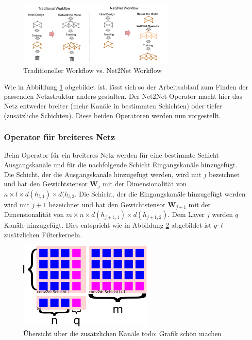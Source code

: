 \begin{figure}[h]
 \centering
 \includegraphics[width=0.7\textwidth]{KapitelPartA/images/net2net.png}
 \caption{Traditioneller Workflow vs. Net2Net Workflow}
 \label{abb:net2net}
\end{figure}


Wie in Abbildung \ref{abb:net2net} abgebildet ist, lässt sich so der Arbeitsablauf zum Finden der passenden Netzstruktur anders gestalten. Der Net2Net-Operator macht hier das Netz entweder breiter (mehr Kanäle in bestimmten Schichten) oder tiefer (zusätzliche Schichten). Diese beiden Operatoren werden nun vorgestellt.

\subsubsection{Operator für breiteres Netz}
Beim Operator für ein breiteres Netz werden für eine bestimmte Schicht Ausgangskanäle und für die nachfolgende Schicht Eingangskanäle hinzugefügt. Die Schicht, der die Ausgangskanäle hinzugefügt werden, wird mit $j$ bezeichnet und hat den Gewichtstensor $\mathbf{W}_j$ mit der Dimensionalität von $n \times l \times d(h_{l,1}) \times d(h_{l,2}$. Die Schicht, der die Eingangskanäle hinzugefügt werden wird mit $j+1$ bezeichnet und hat den Gewichtstensor $\mathbf{W}_{j+1}$ mit der Dimensionalität von $m \times n \times d(h_{j+1,1}) \times d(h_{j+1,2})$. Dem Layer $j$ werden $q$ Kanäle hinzugefügt. Dies entspricht wie in Abbildung \ref{abb:channels} abgebildet ist $q \cdot l $ zusätzlichen Filterkerneln. 
\begin{figure}[h]
 \centering
 \includegraphics[width=0.6\textwidth]{KapitelPartA/images/channels.png}
 \caption{Übersicht über die zusätzlichen Kanäle todo: Grafik schön machen}
\label{abb:channels}
 \end{figure}



